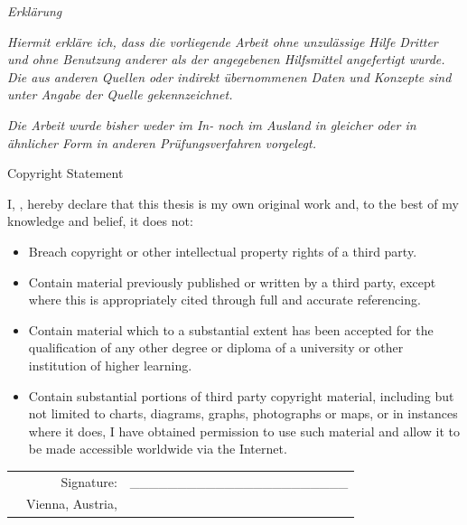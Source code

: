 

\thispagestyle{empty}
\newpage
\vspace*{5em}
\begin{center}
{\LARGE \emph{Erkl\"{a}rung}}
\end{center}
\vfill
\emph{Hiermit erkl\"{a}re ich, dass die vorliegende Arbeit ohne unzul\"{a}ssige Hilfe
Dritter und ohne Benutzung anderer als der angegebenen Hilfsmittel angefertigt
wurde. Die aus anderen Quellen oder indirekt \"{u}bernommenen Daten und Konzepte
sind unter Angabe der Quelle gekennzeichnet.} 

\emph{Die Arbeit wurde bisher
weder im In- noch im Ausland in gleicher oder in \"{a}hnlicher Form in anderen
Pr\"{u}fungsverfahren vorgelegt.}

\vfill
\vspace*{3em}
\begin{center}
{\LARGE Copyright Statement}
\end{center}
\vfill
I, \theauthor, hereby declare that  this thesis is my own original work and, to the best of my knowledge and belief, it does not:
\begin{itemize}
\item Breach copyright or other intellectual property rights of a third party.
\item Contain material previously published or written by a third party, except where this is appropriately cited through full and accurate referencing.
\item Contain material which to a substantial extent has been accepted for the qualification of any other degree or diploma of a university or other institution of higher learning.
\item Contain substantial portions of third party copyright material, including but not limited to charts, diagrams, graphs, photographs or maps, or in instances where it does, I have obtained permission to use such material and allow it to be made accessible worldwide via the Internet.
\end{itemize}
\vfill

\begin{tabular}{m{} r c}
	& Signature: &  \_\_\_\_\_\_\_\_\_\_\_\_\_\_\_\_\_\_\_\_\_\_\_ \\
	& Vienna, Austria, \submissiondate &  \theauthor   \\	
\end{tabular}
\vfill
\newpage
